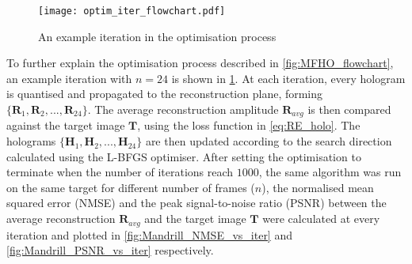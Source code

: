 	\begin{figure}[H]
		\centering
		\texttt{[image: optim\_iter\_flowchart.pdf]}
		\caption{An example iteration in the optimisation process}
		\label{fig:optim_iter_flowchart}
	\end{figure}

	To further explain the optimisation process described in \cref{fig:MFHO_flowchart}, an example iteration with $n=24$ is shown in \cref{fig:optim_iter_flowchart}. At each iteration, every hologram is quantised and propagated to the reconstruction plane, forming $\{\textbf{R}_1, \textbf{R}_2, ..., \textbf{R}_{24}\}$. The average reconstruction amplitude $\textbf{R}_{avg}$ is then compared against the target image $\textbf{T}$, using the loss function in \cref{eq:RE_holo}. The holograms $\{\textbf{H}_1, \textbf{H}_2, ..., \textbf{H}_{24}\}$ are then updated according to the search direction calculated using the L-BFGS optimiser. After setting the optimisation to terminate when the number of iterations reach $1000$, the same algorithm was run on the same target for different number of frames ($n$), the normalised mean squared error (NMSE) and the peak signal-to-noise ratio (PSNR) between the average reconstruction $\textbf{R}_{avg}$ and the target image $\textbf{T}$ were calculated at every iteration and plotted in \cref{fig:Mandrill_NMSE_vs_iter} and \cref{fig:Mandrill_PSNR_vs_iter} respectively.

